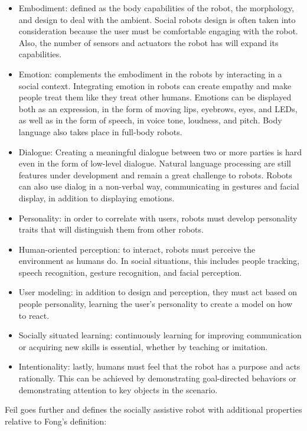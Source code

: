 \begin{itemize}
    \item Embodiment: defined as the body capabilities of the robot, the morphology, and design to deal with the ambient. Social robots design is often taken into consideration because the user must be comfortable engaging with the robot. Also, the number of sensors and actuators the robot has will expand its capabilities.
    \item Emotion: complements the embodiment in the robots by interacting in a social context. Integrating emotion in robots can create empathy and make people treat them like they treat other humans. Emotions can be displayed both as an expression, in the form of moving lips, eyebrows, eyes, and LEDs, as well as in the form of speech, in voice tone, loudness, and pitch. Body language also takes place in full-body robots.
    \item Dialogue: Creating a meaningful dialogue between two or more parties is hard even in the form of low-level dialogue. Natural language processing are still features under development and remain a great challenge to robots. Robots can also use dialog in a non-verbal way, communicating in gestures and facial display, in addition to displaying emotions.
    \item Personality: in order to correlate with users, robots must develop personality traits that will distinguish them from other robots.
    \item Human-oriented perception: to interact, robots must perceive the environment as humans do. In social situations, this includes people tracking, speech recognition, gesture recognition, and facial perception.
    \item User modeling: in addition to design and perception, they must act based on people personality, learning the user's personality to create a model on how to react.
    \item Socially situated learning: continuously learning for improving communication or acquiring new skills is essential, whether by teaching or imitation.
    \item Intentionality: lastly, humans must feel that the robot has a purpose and acts rationally. This can be achieved by demonstrating goal-directed behaviors or demonstrating attention to key objects in the scenario.
\end{itemize}

Feil goes further and defines the socially assistive robot with additional properties relative to Fong's definition:

